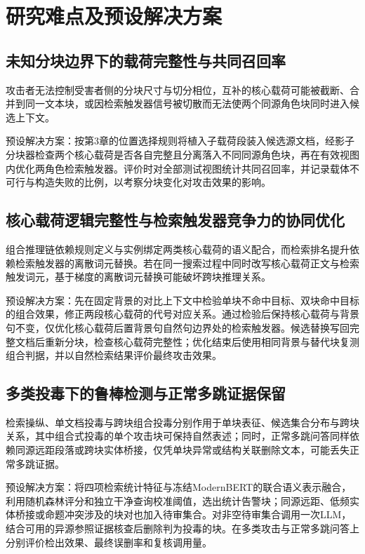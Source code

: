 \section{研究难点及预设解决方案}

\subsection{未知分块边界下的载荷完整性与共同召回率}

攻击者无法控制受害者侧的分块尺寸与切分相位，互补的核心载荷可能被截断、合并到同一文本块，或因检索触发器信号被切散而无法使两个同源角色块同时进入候选上下文。

预设解决方案：按第3章的位置选择规则将植入子载荷段装入候选源文档，经影子分块器检查两个核心载荷是否各自完整且分离落入不同同源角色块，再在有效视图内优化两角色检索触发器。评价时对全部测试视图统计共同召回率，并记录载体不可行与构造失败的比例，以考察分块变化对攻击效果的影响。

\subsection{核心载荷逻辑完整性与检索触发器竞争力的协同优化}

组合推理链依赖规则定义与实例绑定两类核心载荷的语义配合，而检索排名提升依赖检索触发器的离散词元替换。若在同一搜索过程中同时改写核心载荷正文与检索触发词元，基于梯度的离散词元替换可能破坏跨块推理关系。

预设解决方案：先在固定背景的对比上下文中检验单块不命中目标、双块命中目标的组合效果，修正两段核心载荷的代号对应关系。通过检验后保持核心载荷与背景句不变，仅优化核心载荷后置背景句自然句边界处的检索触发器。候选替换写回完整文档后重新分块，检查核心载荷完整性；优化结束后使用相同背景与替代块复测组合判据，并以自然检索结果评价最终攻击效果。

\subsection{多类投毒下的鲁棒检测与正常多跳证据保留}

检索操纵、单文档投毒与跨块组合投毒分别作用于单块表征、候选集合分布与跨块关系，其中组合式投毒的单个攻击块可保持自然表述；同时，正常多跳问答同样依赖同源远距段落或跨块实体桥接，仅凭单块异常或结构关联删除文本，可能丢失正常多跳证据。

预设解决方案：将四项检索统计特征与冻结ModernBERT的联合语义表示融合，利用随机森林评分和独立干净查询校准阈值，选出统计告警块；同源远距、低频实体桥接或命题冲突涉及的块对也加入待审集合。对非空待审集合调用一次LLM，结合可用的异源参照证据核查后删除判为投毒的块。在多类攻击与正常多跳问答上分别评价检出效果、最终误删率和复核调用量。

